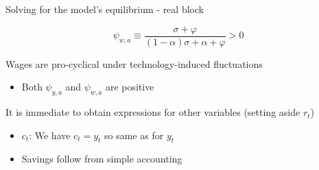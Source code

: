 

\begin{frame}{Solving for the model's equilibrium - real block}

\[
\psi_{w,a} \equiv \frac{\sigma + \varphi}{(1-\alpha)\sigma+\alpha+\varphi} > 0
\]

Wages are pro-cyclical under technology-induced fluctuations
\begin{itemize}
\item	Both $\psi_{y,a}$ and $\psi_{w,a}$ are positive
\end{itemize}

\vspace{2mm}
It is immediate to obtain expressions for other variables (setting aside $r_{t}$)
\begin{itemize}
\item	$c_{t}$: We have $c_{t}=y_{t}$ so same as for $y_{t}$
\item	Savings follow from simple accounting
\end{itemize}

\end{frame}

